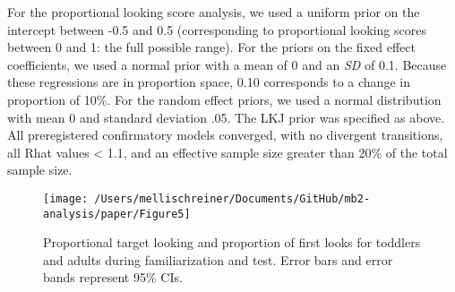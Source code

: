 \documentclass[
  man,floatsintext]{apa6}
\begin{document}
For the proportional looking score analysis, we used a uniform prior on the intercept between -0.5 and 0.5 (corresponding to proportional looking scores between 0 and 1: the full possible range). For the priors on the fixed effect coefficients, we used a normal prior with a mean of 0 and an \emph{SD} of 0.1. Because these regressions are in proportion space, 0.10 corresponds to a change in proportion of 10\%. For the random effect priors, we used a normal distribution with mean 0 and standard deviation .05. The LKJ prior was specified as above.
All preregistered confirmatory models converged, with no divergent transitions, all Rhat values \textless{} 1.1, and an effective sample size greater than 20\% of the total sample size.

\begin{figure}

{\centering \texttt{[image: /Users/mellischreiner/Documents/GitHub/mb2-analysis/paper/Figure5]} 

}

\caption{Proportional target looking and proportion of first looks for toddlers and adults during familiarization and test. Error bars and error bands represent 95\% CIs.}\label{fig:fig4}
\end{figure}
\end{document}

